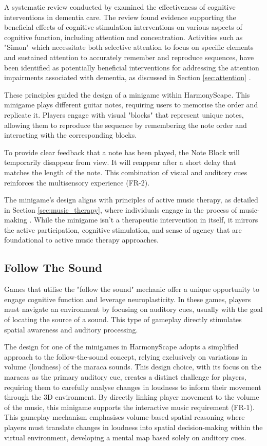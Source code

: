 \documentclass{l4proj}
\begin{document}
A systematic review conducted by \cite{clare_cognitive_2004} examined the effectiveness of cognitive interventions in dementia care. The review found evidence supporting the beneficial effects of cognitive stimulation interventions on various aspects of cognitive function, including attention and concentration. Activities such as "Simon" which necessitate both selective attention to focus on specific elements and sustained attention to accurately remember and reproduce sequences, have been identified as potentially beneficial interventions for addressing the attention impairments associated with dementia, as discussed in Section \ref{sec:attention} \citep{clare_cognitive_2004}.

These principles guided the design of a minigame within HarmonyScape. This minigame plays different guitar notes, requiring users to memorise the order and replicate it. Players engage with visual "blocks" that represent unique notes, allowing them to reproduce the sequence by remembering the note order and interacting with the corresponding blocks.

To provide clear feedback that a note has been played, the Note Block will temporarily disappear from view. It will reappear after a short delay that matches the length of the note. This combination of visual and auditory cues reinforces the multisensory experience (FR-2).

The minigame's design aligns with principles of active music therapy, as detailed in Section \ref{sec:music_therapy}, where individuals engage in the process of music-making \citep{vink_music_2004}.  While the minigame isn't a therapeutic intervention in itself, it mirrors the active participation, cognitive stimulation, and sense of agency that are foundational to active music therapy approaches.

\subsection{Follow The Sound}
Games that utilise the "follow the sound" mechanic offer a unique opportunity to engage cognitive function and leverage neuroplasticity. In these games, players must navigate an environment by focusing on auditory cues, usually with the goal of locating the source of a sound. This type of gameplay directly stimulates spatial awareness and auditory processing.

The design for one of the minigames in HarmonyScape adopts a simplified approach to the follow-the-sound concept, relying exclusively on variations in volume (loudness) of the maraca sounds. This design choice, with its focus on the maracas as the primary auditory cue, creates a distinct challenge for players, requiring them to carefully analyse changes in loudness to inform their movement through the 3D environment. By directly linking player movement to the volume of the music, this minigame supports the interactive music requirement (FR-1). This gameplay mechanism emphasises volume-based spatial reasoning where players must translate changes in loudness into spatial decision-making within the virtual environment, developing a mental map based solely on auditory cues.
\end{document}
